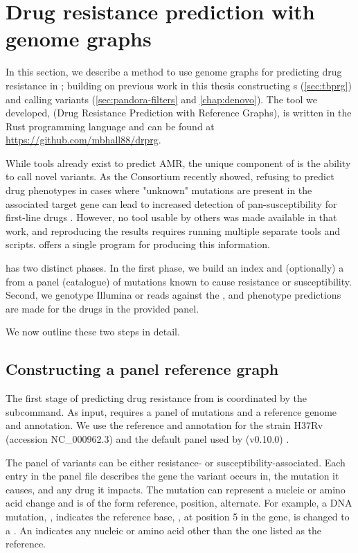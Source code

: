 \section{Drug resistance prediction with genome graphs}
\label{sec:drprg-methods}

In this section, we describe a method to use genome graphs for predicting drug resistance in \mtb{}; building on previous work in this thesis constructing \mtb{} \panrg{}s (\autoref{sec:tbprg}) and calling variants (\autoref{sec:pandora-filters} and \autoref{chap:denovo}). The tool we developed, \drprg{} (Drug Resistance Prediction with Reference Graphs), is written in the Rust programming language and can be found at \url{https://github.com/mbhall88/drprg}.

While tools already exist to predict \mtb{} AMR, the unique component of \drprg{} is the ability to call novel variants. As the \cryptic{} Consortium recently showed, refusing to predict drug phenotypes in cases where "unknown" mutations are present in the associated target gene can lead to increased detection of pan-susceptibility for first-line drugs \cite{cryptic2018}. However, no tool usable by others was made available in that work, and reproducing the results requires running multiple separate tools and scripts. \drprg{} offers a single program for producing this information.

\drprg{} has two distinct phases. In the first phase, we build an index and (optionally) a \panrg{} from a panel (catalogue) of mutations known to cause resistance or susceptibility. Second, we genotype Illumina or \ont{} reads against the \panrg{}, and phenotype predictions are made for the drugs in the provided panel.

We now outline these two steps in detail.

\subsection{Constructing a panel reference graph}
\label{sec:drprg-index}

The first stage of predicting drug resistance from \drprg{} is coordinated by the  subcommand. As input,  requires a panel of mutations and a reference genome and annotation. We use the reference and annotation for the \mtb{} strain H37Rv (accession NC\_000962.3) and the default panel used by \mykrobe{} (v0.10.0) \cite{hunt2019}.

The panel of variants can be either resistance- or susceptibility-associated. Each entry in the panel file describes the gene the variant occurs in, the mutation it causes, and any drug it impacts. The mutation can represent a nucleic or amino acid change and is of the form reference, position, alternate. For example, a DNA mutation, , indicates the reference base, , at position 5 in the gene, is changed to a . An  indicates any nucleic or amino acid other than the one listed as the reference.


